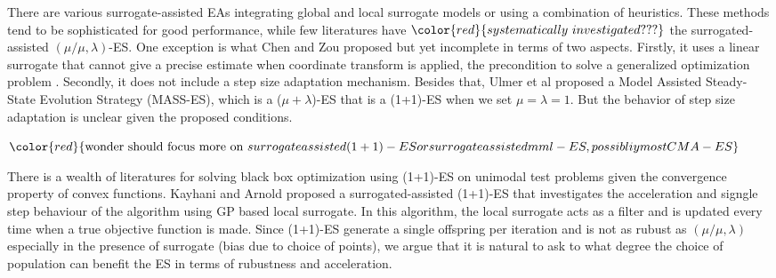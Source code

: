 There are various surrogate-assisted EAs integrating global and local surrogate models or using a combination of heuristics. These methods tend to be sophisticated for good performance, while few literatures have $\color{red}{systematically\ investigated ???}$ the surrogated-assisted $(\mu/\mu,\lambda)$-ES. One exception is what Chen and Zou \cite{10.1007/978-3-319-09333-8_4} proposed but yet incomplete in terms of two aspects. Firstly, it uses a linear surrogate that cannot give a precise estimate when coordinate transform is applied, the precondition to solve a generalized optimization problem \cite{DBLP:conf/ppsn/KayhaniA18}. Secondly, it does not include a step size adaptation mechanism. Besides that, Ulmer et al \cite{Ulmer2005} proposed a Model Assisted Steady-State Evolution Strategy (MASS-ES), which is a ($\mu+\lambda$)-ES that is a (1+1)-ES when we set $\mu=\lambda=1$. But the behavior of step size adaptation is unclear given the proposed conditions.




$\color{red}{\text{wonder should focus more on } surrogate assisted (1+1)-ES or surrogate assisted mml-ES, possibliy most CMA-ES}$

There is a wealth of literatures for solving black box optimization using (1+1)-ES on unimodal test problems given the convergence property of convex functions. Kayhani and Arnold \cite{DBLP:conf/ppsn/KayhaniA18} proposed a surrogated-assisted (1+1)-ES that investigates the acceleration and signgle step behaviour of the algorithm using GP based local surrogate. In this algorithm, the local surrogate acts as a filter and is updated every time when a true objective function is made. Since (1+1)-ES generate a single offspring per iteration and is not as rubust as $(\mu/\mu,\lambda)$ especially in the presence of surrogate (bias due to choice of points), we argue that it is natural to ask to what degree the choice of population can benefit the ES in terms of rubustness and acceleration.

 
